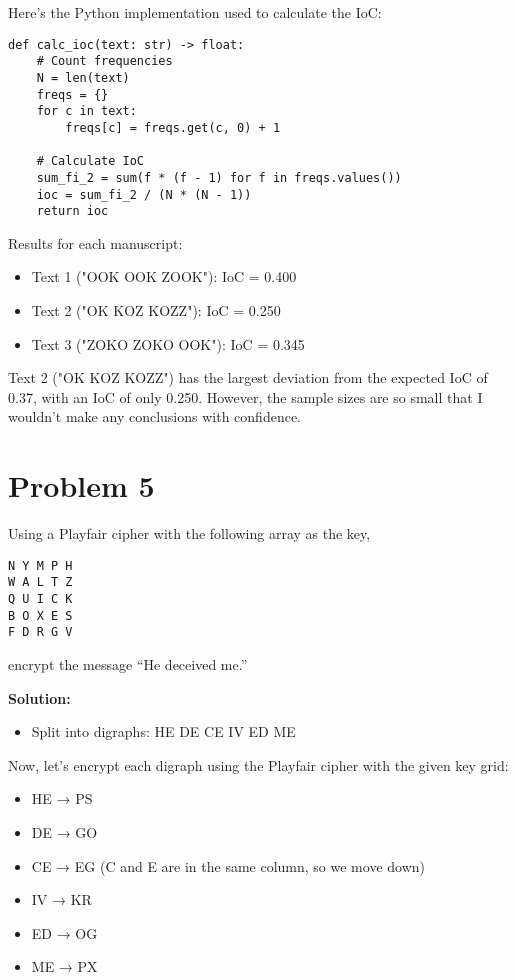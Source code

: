 \documentclass[12pt]{article}
\begin{document}
\vspace{1em}
Here's the Python implementation used to calculate the IoC:

\begin{lstlisting}[style=python]
def calc_ioc(text: str) -> float:
    # Count frequencies
    N = len(text)
    freqs = {}
    for c in text:
        freqs[c] = freqs.get(c, 0) + 1
    
    # Calculate IoC
    sum_fi_2 = sum(f * (f - 1) for f in freqs.values())
    ioc = sum_fi_2 / (N * (N - 1))
    return ioc
\end{lstlisting}

Results for each manuscript:
\begin{itemize}
    \item Text 1 ("OOK OOK ZOOK"): IoC = 0.400
    \item Text 2 ("OK KOZ KOZZ"): IoC = 0.250
    \item Text 3 ("ZOKO ZOKO OOK"): IoC = 0.345
\end{itemize}

Text 2 ("OK KOZ KOZZ") has the largest deviation from the expected IoC of 0.37, with an IoC of only 0.250. However, the sample sizes are so small that I wouldn't make any conclusions with confidence.

\newpage
\section*{Problem 5}
Using a Playfair cipher with the following array as the key,

\begin{verbatim}
N Y M P H
W A L T Z
Q U I C K
B O X E S
F D R G V
\end{verbatim}

encrypt the message ``He deceived me.''

\vspace{1em}
\textbf{Solution:}

\begin{itemize}
    \item Split into digraphs: HE DE CE IV ED ME
\end{itemize}

Now, let's encrypt each digraph using the Playfair cipher with the given key grid:

\begin{itemize}
    \item HE → PS 
    \item DE → GO
    \item CE → EG (C and E are in the same column, so we move down)
    \item IV → KR 
    \item ED → OG
    \item ME → PX
\end{itemize}
\end{document}
